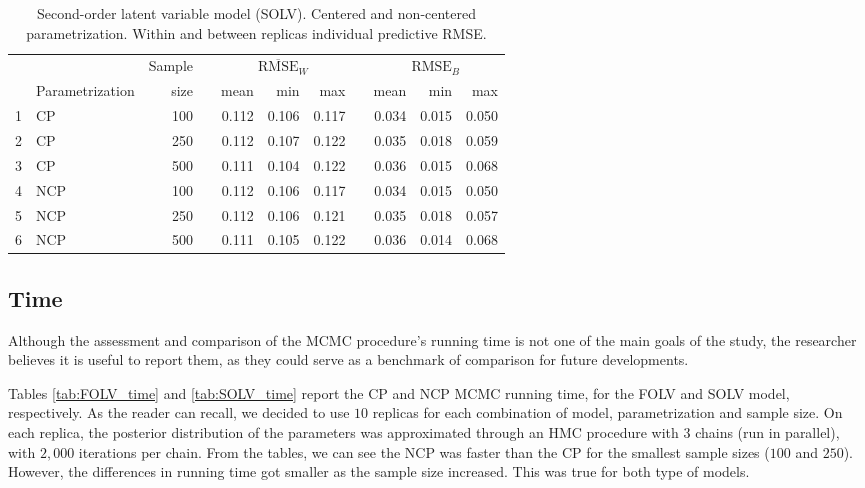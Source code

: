 \begin{table}[H]
	\centering
	\begin{tabular}{rlrrrrrrrrr}
		\hline
		&  & Sample && \multicolumn{3}{c}{ $\overline{\text{RMSE}}_{W}$ } && \multicolumn{3}{c}{ $\text{RMSE}_{B}$ } \\
		\cmidrule(rl){5-7} \cmidrule(rl){9-11}  
		& Parametrization & size  && mean & min & max && mean & min & max \\ 
		\hline\hline
		1 & CP & 100 && 0.112 & 0.106 & 0.117 && 0.034 & 0.015 & 0.050 \\ 
		2 & CP & 250 && 0.112 & 0.107 & 0.122 && 0.035 & 0.018 & 0.059 \\ 
		3 & CP & 500 && 0.111 & 0.104 & 0.122 && 0.036 & 0.015 & 0.068 \\ 
		\hline
		4 & NCP & 100 && 0.112 & 0.106 & 0.117 && 0.034 & 0.015 & 0.050 \\
		5 & NCP & 250 && 0.112 & 0.106 & 0.121 && 0.035 & 0.018 & 0.057 \\
		6 & NCP & 500 && 0.111 & 0.105 & 0.122 && 0.036 & 0.014 & 0.068 \\ 
		\hline
	\end{tabular}
	\caption[Second-order latent variable model (SOLV). Centered and non-centered parametrization. Within and between replicas individual predictive RMSE.]%
	{Second-order latent variable model (SOLV). Centered and non-centered parametrization. Within and between replicas individual predictive RMSE.}
	\label{tab:SOLV_accuracy}
\end{table}


\subsection{Time}

Although the assessment and comparison of the MCMC procedure's running time is not one of the main goals of the study, the researcher believes it is useful to report them, as they could serve as a benchmark of comparison for future developments.

Tables \ref{tab:FOLV_time} and \ref{tab:SOLV_time} report the CP and NCP MCMC running time, for the FOLV and SOLV model, respectively. As the reader can recall, we decided to use $10$ replicas for each combination of model, parametrization and sample size. On each replica, the posterior distribution of the parameters was approximated through an HMC procedure with $3$ chains (run in parallel), with $2,000$ iterations per chain. From the tables, we can see the NCP was faster than the CP for the smallest sample sizes ($100$ and $250$).  However, the differences in running time got smaller as the sample size increased. This was true for both type of models. 

